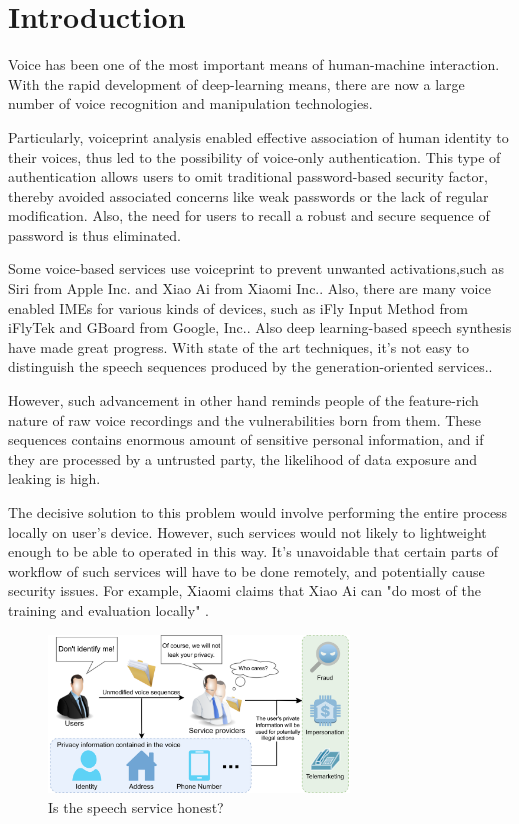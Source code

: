 \documentclass[journal]{IEEEtran} %
\begin{document}
\section{Introduction}
Voice has been one of the most important means of human-machine interaction. With the rapid development of deep-learning means, there are now a large number of voice recognition and manipulation technologies.

Particularly, voiceprint analysis enabled effective association of human identity to their voices, thus led to the possibility of voice-only authentication. This type of authentication allows users to omit traditional password-based security factor, thereby avoided associated concerns like weak passwords or the lack of regular modification. Also, the need for users to recall a robust and secure sequence of password is thus eliminated.

Some voice-based services use voiceprint to prevent unwanted activations,such as Siri from Apple Inc. and Xiao Ai from Xiaomi Inc.\cite{a19, a20}. Also, there are many voice enabled IMEs for various kinds of devices, such as iFly Input Method from iFlyTek and GBoard from Google, Inc.\cite{a21, a22}. Also deep learning-based speech synthesis have made great progress. With state of the art techniques, it's not easy to distinguish the speech sequences produced by the generation-oriented services.\cite{a12}.

However, such advancement in other hand reminds people of the feature-rich nature of raw voice recordings and the vulnerabilities born from them\cite{a6, a7}. These sequences contains enormous amount of sensitive personal information, and if they are processed by a untrusted party, the likelihood of data exposure and leaking is high.

The decisive solution to this problem would involve performing the entire process locally on user's device. However, such services would not likely to lightweight enough to be able to operated in this way. It's unavoidable that certain parts of workflow of such services will have to be done remotely, and potentially cause security issues. For example, Xiaomi claims that Xiao Ai can "do most of the training and evaluation locally" \cite{a20}.

\begin{figure}[htbp]
    \centerline{\includegraphics[width=8cm]{case2v3.png}}
    \caption{Is the speech service honest?}
    \label{case2}
\end{figure}
\end{document}
